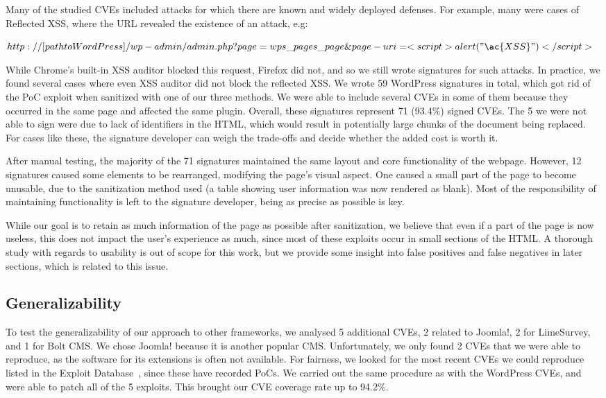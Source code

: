 Many of the studied CVEs included attacks for which there are known and widely deployed defenses. For example, many were cases of Reflected \ac{XSS}, where the URL revealed the existence of an attack, e.g:


$http://[path to WordPress]/wp-admin/admin.php?page=wps\_pages\_page\&page-uri=<script>alert("\ac{XSS}")</script>$

While Chrome's built-in \ac{XSS} auditor blocked this request, Firefox did not, and so we still wrote signatures for such attacks. In practice, we found several cases where even XSS auditor did not block the reflected XSS. We wrote 59 WordPress signatures in total, which got rid of the PoC exploit when sanitized with one of our three methods. We were able to include several CVEs in some of them because they occurred in the same page and affected the same plugin. Overall, these signatures represent 71 (93.4\%) signed CVEs. The 5 we were not able to sign were due to lack of identifiers in the HTML, which would result in potentially large chunks of the document being replaced. For cases like these, the signature developer can weigh the trade-offs and decide whether the added cost is worth it.

After manual testing, the majority of the 71 signatures maintained the same layout and core functionality of the webpage. However, 12 signatures caused some elements to be rearranged, modifying the page's visual aspect. One caused a small part of the page to become unusable, due to the sanitization method used (a table showing user information was now rendered as blank). Most of the responsibility of maintaining functionality is left to the signature developer, being as precise as possible is key.

While our goal is to retain as much information of the page as possible after sanitization, we believe that even if a part of the page is now useless, this does not impact the user's experience as much, since most of these exploits occur in small sections of the HTML. A thorough study with regards to usability is out of scope for this work, but we provide some insight into false positives and false negatives in later sections, which is related to this issue.

\subsection{Generalizability} \label{generalizability}

To test the generalizability of our approach to other frameworks, we
analysed 5 additional CVEs, 2 related to Joomla!, 2 for LimeSurvey,
and 1 for Bolt CMS.  We chose Joomla! because it is another
popular \ac{CMS}. Unfortunately, we only found 2 CVEs
that we were able to reproduce, as the software for its extensions is
often not available. For fairness, we looked for the most recent CVEs
we could reproduce listed in the Exploit Database~\cite{exploitdb}, since
these have recorded \acp{PoC}. We carried out the same
procedure as with the WordPress CVEs, and were able to patch all of
the 5 exploits. This brought our CVE coverage rate up to 94.2\%.

